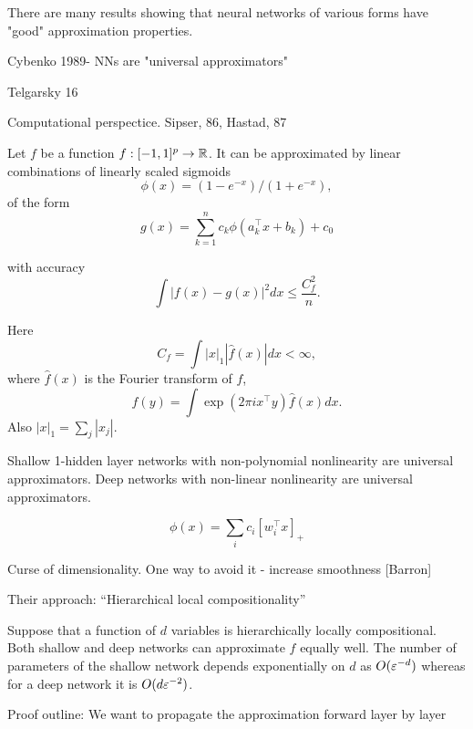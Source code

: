 \documentclass[english]{article}
\begin{document}
There are many results showing that neural networks of various forms have "good" approximation properties. 

\benum 
\item Cybenko 1989- NNs are "universal approximators"

Telgarsky 16

\item 
Computational perspectice. Sipser, 86, Hastad, 87



\item
\begin{theorem}[Barron, 1993]

Let $f$ be a function $f:[-1,1]^p \to \mathbb{R}$. It can be approximated by linear combinations of linearly scaled sigmoids $$\phi(x) = (1-e^{-x})/(1+e^{-x}),$$ of the form $$g(x) = \sum_{k=1}^n c_k \phi (a_k^\top x +b_k)+c_0$$ 

with accuracy $$\int |f(x)-g(x)|^2 dx \le \frac{C_f^2 }{n}.$$

Here $$C_f = \int |x|_1 |\hat f(x)|dx <\infty,$$ where $\hat f(x)$ is the Fourier transform of $f$, 
$$f(y) = \int\exp(2\pi i x^\top y) \hat f(x) dx.$$ Also $|x|_1 = \sum_j |x_j|$. 
\end{theorem}


\item 

\begin{theorem} Shallow 1-hidden layer networks with non-polynomial nonlinearity are universal approximators. Deep networks with non-linear nonlinearity are universal approximators. 

$$\phi(x) = \sum_i c_i [w_i^\top x]_+$$
\end{theorem}

Curse of dimensionality. One way to avoid it - increase smoothness [Barron]

Their approach: ``Hierarchical local compositionality''

\begin{theorem}

Suppose that a function of $d$ variables is hierarchically locally compositional. Both shallow and deep networks can approximate $f$ equally well. The number of parameters of the shallow network depends exponentially on $d$ as $O(\varepsilon^{-d})$ whereas for a deep network it is $O(d\varepsilon^{-2})$.
\end{theorem}

Proof outline: We want to propagate the approximation forward layer by layer
\end{document}
